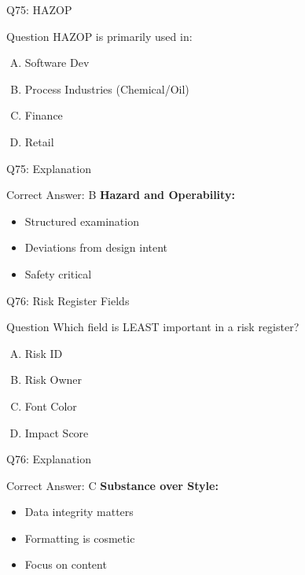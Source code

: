 \documentclass{beamer}
\begin{document}
			\begin{frame}{Q75: HAZOP}
				\begin{block}{Question}
					HAZOP is primarily used in:
				\end{block}
				\begin{enumerate}[(A)]
					\item Software Dev
					\item Process Industries (Chemical/Oil)
					\item Finance
					\item Retail
				\end{enumerate}
			\end{frame}
			\begin{frame}{Q75: Explanation}
				\begin{block}{Correct Answer: B}
					\textbf{Hazard and Operability:}
					\begin{itemize}
						\item Structured examination
						\item Deviations from design intent
						\item Safety critical
					\end{itemize}
				\end{block}
			\end{frame}
			
			\begin{frame}{Q76: Risk Register Fields}
				\begin{block}{Question}
					Which field is LEAST important in a risk register?
				\end{block}
				\begin{enumerate}[(A)]
					\item Risk ID
					\item Risk Owner
					\item Font Color
					\item Impact Score
				\end{enumerate}
			\end{frame}
			\begin{frame}{Q76: Explanation}
				\begin{block}{Correct Answer: C}
					\textbf{Substance over Style:}
					\begin{itemize}
						\item Data integrity matters
						\item Formatting is cosmetic
						\item Focus on content
					\end{itemize}
				\end{block}
			\end{frame}
			
\end{document}
